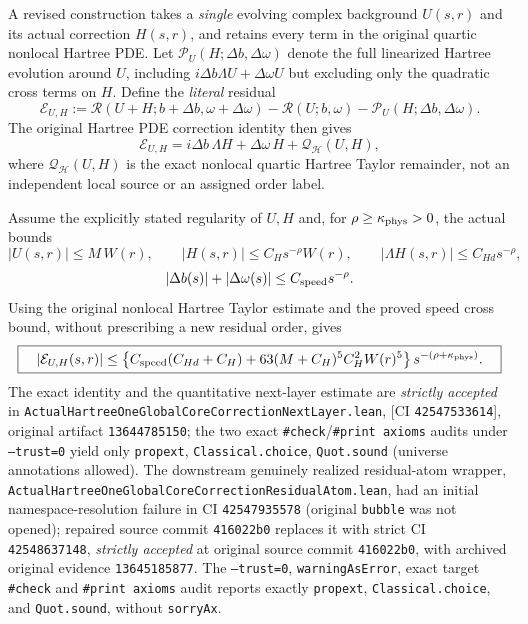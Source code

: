 \documentclass[11pt]{amsart}
\newcommand{\HH}{\mathcal H}
\begin{document}
A revised construction takes a \emph{single} evolving complex
background $U(s,r)$ and its actual correction $H(s,r)$, and
retains every term in the original quartic nonlocal Hartree PDE.
Let $\mathcal P_U(H;\Delta b,\Delta\omega)$ denote the full
linearized Hartree evolution around $U$, including
$i\Delta b\Lambda U+\Delta\omega U$ but excluding only the
quadratic cross terms on $H$.  Define the \emph{literal} residual
\[
 \mathcal E_{U,H}:=
 \mathcal R(U+H;b+\Delta b,\omega+\Delta\omega)
 -\mathcal R(U;b,\omega)-\mathcal P_U(H;\Delta b,\Delta\omega).
\]
The original Hartree PDE correction identity then gives
\begin{equation}
 \mathcal E_{U,H}
 =i\Delta b\,\Lambda H+\Delta\omega\,H
   +\mathcal Q_{\HH}(U,H),
 \label{eq:hbl-genuine-single-core-nonlinear-remainder}
\end{equation}
where $\mathcal Q_{\HH}(U,H)$ is the exact nonlocal
quartic Hartree Taylor remainder, not an independent local
source or an assigned order label.

Assume the explicitly stated regularity of $U,H$ and,
for $\rho\ge\kappa_{\rm phys}>0$, the actual bounds
\[
 |U(s,r)|\le M\,W(r),\qquad
 |H(s,r)|\le C_Hs^{-\rho}W(r),\qquad
 |\Lambda H(s,r)|\le C_{Hd}s^{-\rho},
\]
\[
 |\Delta b(s)|+|\Delta\omega(s)|
 \le C_{\rm speed}s^{-\rho}.
\]
Using the original nonlocal Hartree Taylor estimate and
the proved speed cross bound, without prescribing a new
residual order, gives
\[
 \boxed{\quad
 |\mathcal E_{U,H}(s,r)|
 \le\left\{
   C_{\rm speed}(C_{Hd}+C_H)
   +63(M+C_H)^5C_H^2W(r)^5
 \right\}s^{-(\rho+\kappa_{\rm phys})}.
 \quad}
\]
The exact identity and the quantitative next-layer estimate
are \emph{strictly accepted} in
\texttt{ActualHartreeOneGlobalCoreCorrectionNextLayer.lean},
[CI \texttt{42547533614}], original artifact
\texttt{13644785150}; the two exact
\texttt{\#check}/\texttt{\#print axioms} audits under
\texttt{--trust=0} yield only
\texttt{propext}, \texttt{Classical.choice},
\texttt{Quot.sound} (universe annotations allowed).
The downstream genuinely realized residual-atom wrapper,
\texttt{ActualHartreeOneGlobalCoreCorrectionResidualAtom.lean},
had an initial namespace-resolution failure in
CI \texttt{42547935578} (original \texttt{bubble}
was not opened); repaired source commit \texttt{416022b0}
replaces it with strict CI \texttt{42548637148},
\emph{strictly accepted} at original source commit \texttt{416022b0},
with archived original evidence \texttt{13645185877}.  The
\texttt{--trust=0}, \texttt{warningAsError}, exact target
\texttt{\#check} and \texttt{\#print axioms} audit reports exactly
\texttt{propext}, \texttt{Classical.choice}, and
\texttt{Quot.sound}, without \texttt{sorryAx}.
\end{document}
